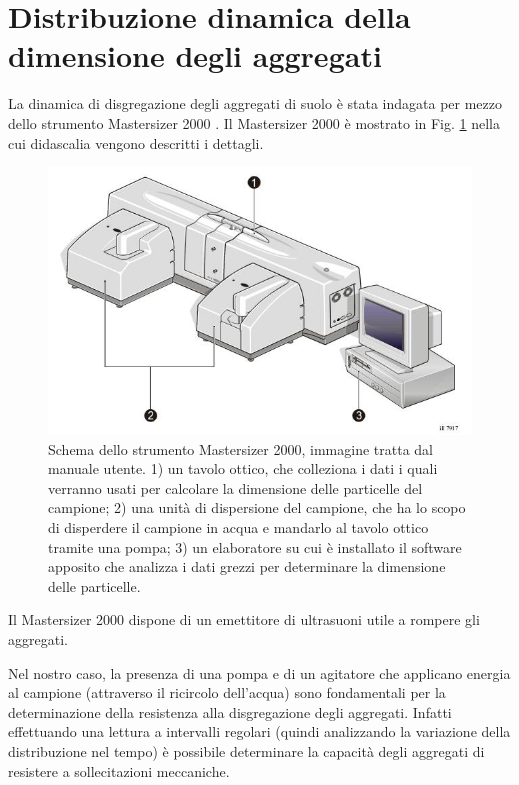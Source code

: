\documentclass[11pt, a4paper, openright, titlepage, final, language = italian]{book}
\begin{document}
\section{Distribuzione dinamica della dimensione degli aggregati}
La dinamica di disgregazione degli aggregati di suolo \`e stata
indagata per mezzo dello strumento Mastersizer 2000 \citep{Mas_2000}.
Il Mastersizer 2000 \`e mostrato in Fig. \ref{fig:Mastersize2000}
nella cui didascalia vengono descritti i dettagli.
\begin{figure}[ht]
  \centering
  \includegraphics[width= \textwidth]{../foto/mastersizer.jpeg}
  \caption{Schema dello strumento Mastersizer 2000,
    immagine tratta dal manuale utente.  1) un tavolo ottico, che
    colleziona i dati i quali verranno usati per calcolare la
    dimensione delle particelle del campione; 2) una unit\`a di
    dispersione del campione, che ha lo scopo di disperdere il
    campione in acqua e mandarlo al tavolo ottico tramite una pompa;
    3) un elaboratore su cui è installato il software apposito che
    analizza i dati grezzi per determinare la dimensione delle
    particelle.\label{fig:Mastersize2000}}
\end{figure}

Il Mastersizer 2000 dispone di un emettitore di
ultrasuoni utile a rompere gli aggregati.

Nel nostro caso, la presenza di una pompa e di un agitatore che
applicano energia al campione (attraverso il ricircolo dell'acqua)
sono fondamentali per la determinazione della resistenza alla
disgregazione degli aggregati. Infatti effettuando una lettura a
intervalli regolari (quindi analizzando la variazione della
distribuzione nel tempo) \`e possibile determinare la capacit\`a degli
aggregati di resistere a sollecitazioni meccaniche.
\end{document}
